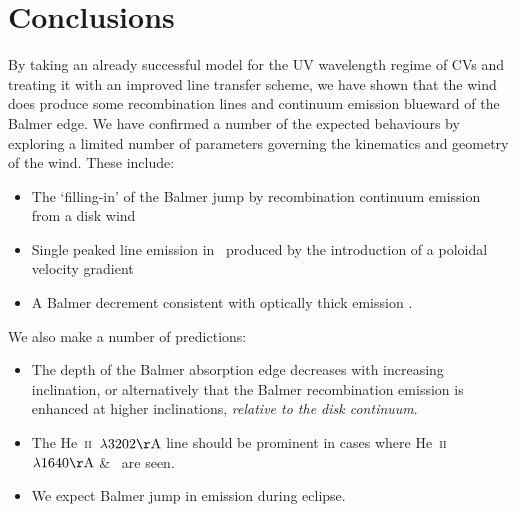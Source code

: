 \documentclass[preprint, a4paper, 11pt]{aastex}
\begin{document}






%
%


\section{Conclusions}

By taking an already successful model
for the UV wavelength regime of CVs and treating 
it with an improved line transfer scheme, we have shown
that the wind does produce some recombination lines
and continuum emission blueward of the Balmer edge.
We have confirmed a number of the expected behaviours
by exploring a limited number of parameters governing the
kinematics and geometry of the wind. These include:

\renewcommand{\labelitemi}{$\bullet$}
\begin{itemize}
	\item The `filling-in' of the Balmer jump \citep{KLWB98} by recombination 
	continuum emission from a disk wind
	\item Single peaked line emission in \ha\ produced by 
	the introduction of a poloidal velocity gradient \citep{MC96}
	\item A Balmer decrement consistent with optically thick emission \citep{elitzur1983}.
\end{itemize}
\smallskip

\noindent We also make a number of predictions:

\begin{itemize}
	\item The depth of the Balmer absorption edge decreases with increasing inclination,
or alternatively that the Balmer recombination emission
is enhanced at higher inclinations, {\sl relative to the disk continuum}.
	\item The He~\textsc{ii}~$\lambda3202{\rm \AA}$ line should be
prominent in cases where He~\textsc{ii}~$\lambda1640{\rm \AA}$ \& 
\heiiopt\ are seen. 
	\item We expect Balmer jump in emission during eclipse.
\end{itemize}
\end{document}
